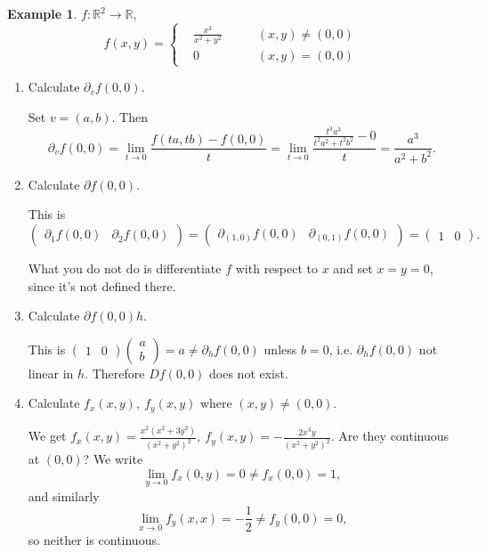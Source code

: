 \documentclass[a4paper]{article}
\theoremstyle{definition}
\newtheorem{eg}[defn]{Example}
\begin{document}
\begin{eg}
$f:\mathbb R^2\rightarrow \mathbb R$,
\[
f(x,y)=\left\{\begin{aligned}&\frac{x^3}{x^2+y^2} \qquad &(x,y)\neq (0,0)\\ &0 \qquad &(x,y)=(0,0)\end{aligned}\right.
\]
\begin{center}
\end{center}
\begin{enumerate}
    \item Calculate $\partial_v f(0,0)$.
    
    Set $v=(a,b)$. Then
\[
\partial_v f(0,0) = \lim_{t\rightarrow 0} \frac{f(ta,tb)-f(0,0)}{t}=\lim_{t\rightarrow 0} \frac{\frac{t^3a^3}{t^2a^2+t^2b^2}-0}{t}=\frac{a^3}{a^2+b^2} .
\]
    \item Calculate $\partial f(0,0)$.
    
    This is
\[
\begin{pmatrix}\partial_1 f(0,0)&\partial_2 f(0,0)\end{pmatrix}=\begin{pmatrix}\partial_{(1,0)} f(0,0)&\partial_{(0,1)} f(0,0)\end{pmatrix}=\begin{pmatrix}1&0\end{pmatrix}.
\]
    
    What you do not do is differentiate $f$ with respect to $x$ and set $x=y=0$, since it's not defined there.
    \item Calculate $\partial f(0,0)h$.
    
    This is $\begin{pmatrix}1&0\end{pmatrix} \begin{pmatrix}a\\b\end{pmatrix}=a \neq \partial _h f(0,0)$ unless $b=0$, i.e. $\partial _h f(0,0)$ not linear in $h$. Therefore $Df(0,0)$ does not exist.
    \item Calculate $f_x(x,y),\ f_y(x,y)$ where $(x,y)\neq (0,0)$.
    
    We get $f_x(x,y)=\frac{x^2(x^2+3y^2)}{(x^2+y^2)^2},\ f_y(x,y)=-\frac{2x^3y}{(x^2+y^2)^2}$. Are they continuous at $(0,0)$? We write
\[
\lim_{y\rightarrow 0} f_x (0,y) = 0\neq f_x (0,0)=1,
\]
and similarly
\[
\lim_{x\rightarrow 0} f_y (x,x) = -\frac12 \neq f_y(0,0)=0,
\]
so neither is continuous.
\end{enumerate}
\end{eg}
\end{document}
